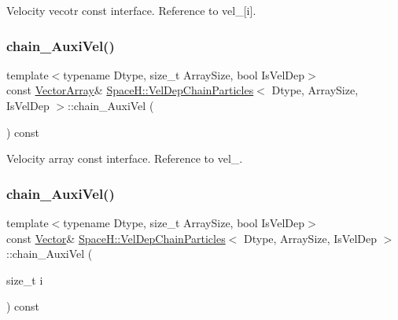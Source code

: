 Velocity vecotr const interface. Reference to vel\+\_\+\mbox{[}i\mbox{]}. 

\mbox{\label{class_space_h_1_1_vel_dep_chain_particles_ab2ec7493ee6cb12ed77f6aac4f4e8660}} 
\subsubsection{\texorpdfstring{chain_\+Auxi\+Vel()}{chainAuxiVel()}\hspace{0.1cm}{\footnotesize\ttfamily [3/4]}}
{\footnotesize\ttfamily template$<$typename Dtype, size\+\_\+t Array\+Size, bool Is\+Vel\+Dep$>$ \\
const \mbox{\hyperlink{class_space_h_1_1_vel_indep_particles_aa9983058940249df8b00fa800e8cbad2}{Vector\+Array}}\& \mbox{\hyperlink{class_space_h_1_1_vel_dep_chain_particles}{Space\+H\+::\+Vel\+Dep\+Chain\+Particles}}$<$ Dtype, Array\+Size, Is\+Vel\+Dep $>$\+::chain_\+Auxi\+Vel (\begin{DoxyParamCaption}{ }\end{DoxyParamCaption}) const\hspace{0.3cm}{\ttfamily [inline]}}



Velocity array const interface. Reference to vel\+\_\+. 

\mbox{\label{class_space_h_1_1_vel_dep_chain_particles_a1f717dd8619e3237362bacd55623500c}} 
\subsubsection{\texorpdfstring{chain_\+Auxi\+Vel()}{chainAuxiVel()}\hspace{0.1cm}{\footnotesize\ttfamily [4/4]}}
{\footnotesize\ttfamily template$<$typename Dtype, size\+\_\+t Array\+Size, bool Is\+Vel\+Dep$>$ \\
const \mbox{\hyperlink{class_space_h_1_1_vel_indep_particles_a61bbcfdb0dc7f99f3c68af69a755c935}{Vector}}\& \mbox{\hyperlink{class_space_h_1_1_vel_dep_chain_particles}{Space\+H\+::\+Vel\+Dep\+Chain\+Particles}}$<$ Dtype, Array\+Size, Is\+Vel\+Dep $>$\+::chain_\+Auxi\+Vel (\begin{DoxyParamCaption}\item[{size\+\_\+t}]{i }\end{DoxyParamCaption}) const\hspace{0.3cm}{\ttfamily [inline]}}




